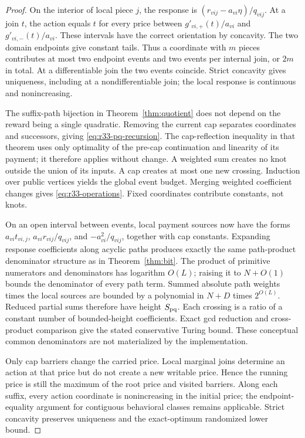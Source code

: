\begin{proof}
On the interior of local piece $j$, the response is $(r_{vij}-a_{vi}\eta)/q_{vij}$. At a join $t$, the action equals $t$ for every price between $g'_{vi,+}(t)/a_{vi}$ and $g'_{vi,-}(t)/a_{vi}$. These intervals have the correct orientation by concavity. The two domain endpoints give constant tails. Thus a coordinate with $m$ pieces contributes at most two endpoint events and two events per internal join, or $2m$ in total. At a differentiable join the two events coincide. Strict concavity gives uniqueness, including at a nondifferentiable join; the local response is continuous and nonincreasing.

The suffix-path bijection in Theorem~\ref{thm:quotient} does not depend on the reward being a single quadratic. Removing the current cap separates coordinates and successors, giving \eqref{eq:r33-pq-recursion}. The cap-reflection inequality in that theorem uses only optimality of the pre-cap continuation and linearity of its payment; it therefore applies without change. A weighted sum creates no knot outside the union of its inputs. A cap creates at most one new crossing. Induction over public vertices yields the global event budget. Merging weighted coefficient changes gives \eqref{eq:r33-operations}. Fixed coordinates contribute constants, not knots.

On an open interval between events, local payment sources now have the forms $a_{vi}t_{vi,j}$, $a_{vi}r_{vij}/q_{vij}$, and $-a_{vi}^2/q_{vij}$, together with cap constants. Expanding response coefficients along acyclic paths produces exactly the same path-product denominator structure as in Theorem~\ref{thm:bit}. The product of primitive numerators and denominators has logarithm $O(L)$; raising it to $N+O(1)$ bounds the denominator of every path term. Summed absolute path weights times the local sources are bounded by a polynomial in $N+D$ times $2^{O(L)}$. Reduced partial sums therefore have height $S_{\rm pq}$. Each crossing is a ratio of a constant number of bounded-height coefficients. Exact gcd reduction and cross-product comparison give the stated conservative Turing bound. These conceptual common denominators are not materialized by the implementation.

Only cap barriers change the carried price. Local marginal joins determine an action at that price but do not create a new writable price. Hence the running price is still the maximum of the root price and visited barriers. Along each suffix, every action coordinate is nonincreasing in the initial price; the endpoint-equality argument for contiguous behavioral classes remains applicable. Strict concavity preserves uniqueness and the exact-optimum randomized lower bound.
\end{proof}

